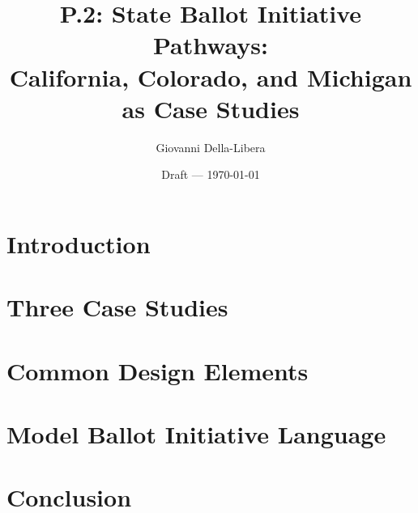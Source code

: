 \documentclass[12pt]{article}
\title{P.2: State Ballot Initiative Pathways:\\
       California, Colorado, and Michigan as Case Studies}
\author{Giovanni Della-Libera}
\date{Draft --- \today}
\begin{document}
\maketitle

\begin{abstract}

\end{abstract}

\newpage
\tableofcontents
\newpage

\section{Introduction}


\section{Three Case Studies}


\section{Common Design Elements}


\section{Model Ballot Initiative Language}


\section{Conclusion}




\end{document}
